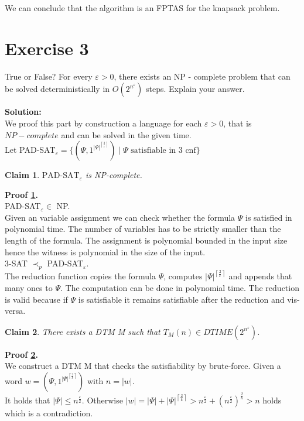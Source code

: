 \documentclass[11pt,a4paper,ngerman]{article}
\newtheorem{lemma}{\bfseries Claim}
\begin{document}
We can conclude that the algorithm is an FPTAS for the knapsack problem.



\section*{Exercise 3}

True or False? For every $\varepsilon > 0$, there exists an NP - complete problem that can be solved deterministically in
$O(2^{n^\varepsilon})$ steps. Explain your answer.

\textbf{Solution:}\\

We proof this part by construction a language for each $\varepsilon > 0$, that is $NP - complete$ and can be solved in
the given time.\\

Let PAD-SAT$_\varepsilon = \{ (\Psi , 1^{|\Psi|^{\left\lceil \frac{2}{\varepsilon} \right\rceil}}) \; | \; \Psi \text{ satisfiable in 3 cnf} \}$\\

\begin{lemma}\label{ex1:t3:npc}
	$\text{PAD-SAT}_\varepsilon$ is NP-complete.
\end{lemma}

\textbf{Proof \ref{ex1:t3:npc}.}\\
PAD-SAT$_\varepsilon \in$ NP.\\
Given an variable assignment we can check whether the formula $\Psi$ is satisfied in polynomial time. 
The number of variables has to be strictly smaller than the length of the formula. The assignment is polynomial bounded
in the input size hence the witness is polynomial in the size of the input.\\

3-SAT $\prec_p$ PAD-SAT$_\varepsilon$.\\
The reduction function copies the formula $\Psi$, computes $|\Psi|^{\left\lceil \frac{2}{\varepsilon} \right\rceil}$
and appends that many ones to $\Psi$. The computation can be done in polynomial time.
The reduction is valid because if $\Psi$ is satisfiable it remains satisfiable after the reduction and vis-versa.

\begin{lemma}\label{ex1:t3:time}
    There exists a DTM M such that $T_M(n) \in DTIME (2^{n^\varepsilon})$.
\end{lemma}

\textbf{Proof \ref{ex1:t3:time}.}\\
We construct a DTM M that checks the satisfiability by brute-force.
Given a word $w = (\Psi, 1^{|\Psi|^{\left\lceil \frac{2}{k} \right\rceil}})$ with $n = |w|$.\\
It holds that $|\Psi| \leq n^\frac{\varepsilon}{2}$. Otherwise 
$|w| = |\Psi| + |\Psi|^{\left\lceil \frac{2}{k} \right\rceil} > n^\frac{\varepsilon}{2} + (n^\frac{\varepsilon}{2})^{\frac{2}{k}} > n$
holds which is a contradiction.\\
\end{document}
